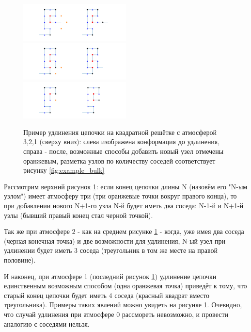 \begin{figure}
    \centering
    \includegraphics[width=0.5\textwidth]{Sections/Images/Atmos_to_neibors_p3.png}
    \includegraphics[width=0.5\textwidth]{Sections/Images/Atmos_to_neibors_p2.png}
    \includegraphics[width=0.5\textwidth]{Sections/Images/Atmos_to_neibors_p1.png}
    \caption{Пример удлинения цепочки на квадратной решётке с атмосферой 3,2,1 (сверху вниз): слева изображена конформация до удлинения, справа - после, возможные способы добавить новый узел отмечены оранжевым, разметка узлов по количеству соседей соответствует рисунку \ref{fig:example_bulk}}
    \label{fig:atmos_neighs}
\end{figure}

Рассмотрим верхний рисунок \ref{fig:atmos_neighs}: если конец цепочки длины N (назовём его "N-ым узлом") имеет атмосферу три (три оранжевые точки вокруг правого конца), то при добавлении нового N+1-го узла N-й будет иметь два соседа: N-1-й и N+1-й узлы (бывший правый конец стал черной точкой). 

Так же при атмосфере 2 - как на среднем рисунке \ref{fig:atmos_neighs} - когда, уже имея два соседа (черная конечная точка) и две возможности для удлинения, N-ый узел при удлинении будет иметь 3 соседа (треугольник в том же месте на правой половине). 

И наконец, при атмосфере 1 (последний рисунок \ref{fig:atmos_neighs}) удлинение цепочки единственным возможным способом (одна оранжевая точка) приведёт к тому, что старый конец цепочки будет иметь 4 соседа (красный квадрат вместо треугольника). Примеры таких явлений можно увидеть на рисунке \ref{fig:atmos_neighs}. Очевидно, что случай удлинения при атмосфере 0 рассмореть невозможно, и провести аналогию с соседями нельзя.


